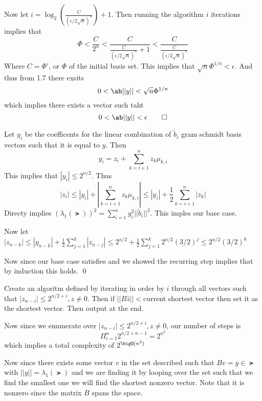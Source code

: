 \documentclass[12pt]{amsart}
\begin{document}
\begin{problem}
\begin{subproblem}
      Now let $i=\log_2(\frac C{(\epsilon/2\sqrt{n})^n})+1$. Then running the algorithm $i$ iterations implies that 
      \[\Phi <\frac C{2^n} < \frac C{\frac C{(\epsilon/2\sqrt{n})^n}+1} < \frac C{\frac C{(\epsilon/2\sqrt{n})^n}}\]
      Where $C =\Phi'$, or $\Phi$ of the initial basis set. This implies that $\sqrt{n}\Phi^{1/n} < \epsilon$.
      And thus from 1.7 there exsits 
      \[0 < \ab||y|| < \sqrt{n}\Phi^{1/n}\]
      which implies there exists a vector such taht 
      \[0<\ab||y||<\epsilon\qed\]
    \end{subproblem}
  \end{problem}
  \begin{problem}
    \begin{subproblem}
      Let $y_i$ be the coefficents for the linear combination of $\tilde b_i$ gram schmidt basis vectors such that it is equal to $y$. Then 
      \[y_i = z_i + \sum_{k=i+1}^n z_k \mu_{k,i}\]
      This implies that $|y_i|\leq 2^{n/2}$. Thus 
      \[|z_i| \leq |y_i| + |\sum_{k=i+1}^n z_k \mu_{k,i}| \leq |y_i| + \frac12\sum_{k=i+1}^n|z_k|\]
      Directy implies $(\lambda_1(\lat))^2 = \sum_{i=1}^n y_i^2 ||\tilde b_i ||^2$. This imples our base case. 

      Now let $|z_{n-k}|\leq |y_{n-k}| + \frac12 \sum_{j=1}^k |z_{n-j}| \leq 2^{n/2} + \frac12\sum_{j=1}^k 2^{n/2}(3/2)^j \leq 2^{n/2}(3/2)^k$

      Now since our base case satisfies and we showed the recurring step implies that by induction this holds. \qed
    \end{subproblem}  
    \begin{subproblem}
      Create an algoritm defined by iterating in order by $i$ through all vectors such that $|z_{n-i}|\leq 2^{n/2+i}, z\neq0$. Then if $||B\hat z||<$current shortest vector then set it as the shortest vector. Then output at the end.

      Now since we enumerate over $|z_{n-i}|\leq 2^{n/2+i}, z\neq0$, our number of steps is 
      \[\Pi_{i=1}^n  2^{n/2+n-1}= 2^{n^2}\]
      which implies a total complexity of $2^{\bigO(n^2)}$

      Now since there exists some vector $v$ in the set described such that $Bv = y\in \lat$ with $||y||=\lambda_1(\lat)$ and we are finding it by looping over the set such that we find the smallest one we will find the shortest nonzero vector. Note that it is nonzero since the matrix $B$ spans the space.
    \end{subproblem}
    \begin{subproblem}
      

\end{subproblem}
\end{problem}
\end{document}
